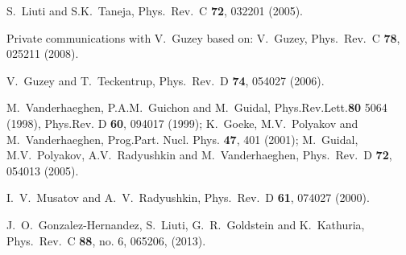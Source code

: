 \documentclass[twocolumn,nofootinbib,showpacs,prl,superscriptaddress,secnumarabic,amssymb,nobibnotes,aps,floatfix]{revtex4}
\begin{document}
\begin{thebibliography}{99}
S.~Liuti and S.K.~Taneja, 
Phys.\ Rev.\ C {\bf 72}, 032201 (2005).

Private communications with V.~Guzey based on: 
V.~Guzey, Phys.\ Rev.\ C {\bf 78}, 025211 (2008).

V.~Guzey and T.~Teckentrup,
Phys.\ Rev.\ D {\bf 74}, 054027 (2006).

M.~Vanderhaeghen, P.A.M.~Guichon and M.~Guidal, Phys.Rev.Lett.{\bf 80} 5064 (1998), 
Phys.Rev. D {\bf 60}, 094017 (1999);
K.~Goeke, M.V.~Polyakov and M.~Vanderhaeghen, Prog.Part. Nucl. Phys. {\bf 47}, 401 (2001);
M.~Guidal, M.V.~Polyakov, A.V.~Radyushkin and M.~Vanderhaeghen, Phys.\ Rev.\ D {\bf 72}, 054013 (2005).

I.~V.~Musatov and A.~V.~Radyushkin, 
Phys.\ Rev.\ D {\bf 61}, 074027 (2000).

J.~O.~Gonzalez-Hernandez, S.~Liuti, G.~R.~Goldstein and K.~Kathuria,
Phys.\ Rev.\ C {\bf 88}, no. 6, 065206, (2013).

\end{thebibliography}
\end{document}
